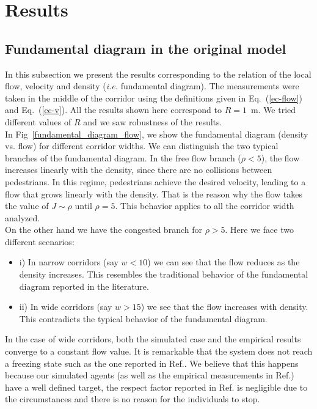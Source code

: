 \section{\label{results}Results}

\subsection{\label{fundamental_diagram} Fundamental diagram in the original model}

In this subsection we present the results corresponding to the relation of the local flow, velocity and density (\textit{i.e.} fundamental diagram). The measurements were taken in the middle of the corridor using the definitions given in Eq.~(\ref{ec-flow}) and Eq.~(\ref{ec-v}). All the results shown here correspond to $R=1$~m. We tried different values of $R$ and we saw robustness of the results. \\

In Fig~\ref{fundamental_diagram_flow}, we show the fundamental diagram (density vs. flow) for different corridor widths. We can distinguish the two typical branches of the fundamental diagram. In the free flow branch ($\rho < 5$), the flow increases linearly with the density, since there are no collisions between pedestrians. In this regime, pedestrians achieve the desired velocity, leading to a flow that grows linearly with the density. That is the reason why the flow takes the value of $J \sim \rho$ until $\rho=5$. This behavior applies to all the corridor width analyzed.\\

On the other hand we have the congested branch  for $\rho > 5$. Here we face two different scenarios:

\begin{itemize}
\item i) In narrow corridors (say $w < 10$) we can see that the flow reduces as the density increases. This resembles the traditional behavior of the fundamental diagram reported in the literature. 
\item ii) In wide corridors (say $w > 15$) we see that the flow increases with density. This contradicts the typical behavior of the fundamental diagram.   
\end{itemize}

In the case of wide corridors, both the simulated case and the empirical results converge to a constant flow value. It is remarkable that the system does not reach a freezing state such as the one reported in Ref.\cite{kwak}. We believe that this happens because our simulated agents (as well as the empirical measurements in Ref.\cite{helbing3}) have a well defined target, the respect factor reported in Ref.\cite{parisi2} is negligible due to the circumstances and there is no reason for the individuals to stop.\\

